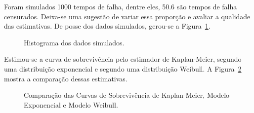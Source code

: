 \documentclass[
  12pt,
  letterpaper,
  DIV=11,
  numbers=noendperiod]{scrreprt}
\begin{document}
Foram simulados 1000 tempos de falha, dentre eles, 50.6 são tempos de
falha censurados. Deixa-se uma sugestão de variar essa proporção e
avaliar a qualidade das estimativas. De posse dos dados simulados,
gerou-se a Figura~\ref{fig-HistSimulCens}.

\begin{figure}[H]

\caption{\label{fig-HistSimulCens}Histograma dos dados simulados.}


\end{figure}%

Estimou-se a curva de sobrevivência pelo estimador de Kaplan-Meier,
segundo uma distribuição exponencial e segundo uma distribuição Weibull.
A Figura~\ref{fig-CompCurvSobr} mostra a comparação dessas estimativas.

\begin{figure}[H]

\caption{\label{fig-CompCurvSobr}Comparação das Curvas de Sobrevivência
de Kaplan-Meier, Modelo Exponencial e Modelo Weibull.}


\end{figure}%
\end{document}

